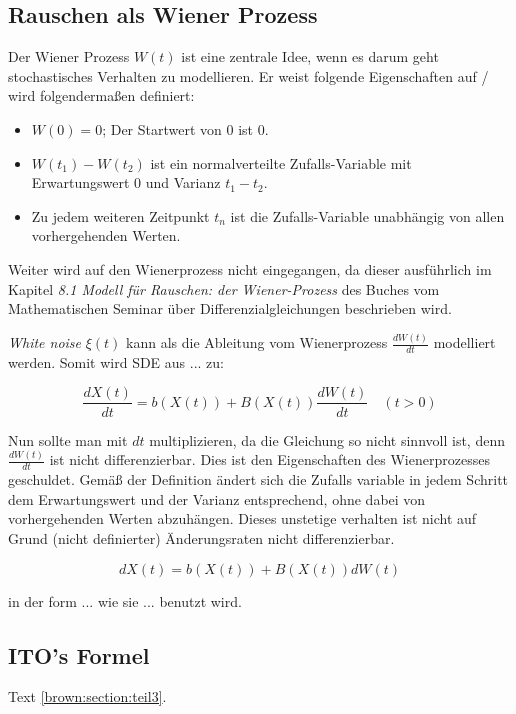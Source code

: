 \subsection{Rauschen als Wiener Prozess
\label{brown:SDGL:Wiener}}

Der Wiener Prozess $ W(t) $ ist eine zentrale Idee, wenn es darum geht stochastisches Verhalten zu modellieren. Er weist folgende Eigenschaften auf / wird folgendermaßen definiert:


\begin{itemize}
	\item $ W(0) = 0 $; Der Startwert von 0 ist 0.
	\item $ W(t_{1}) - W(t_{2}) $ ist ein normalverteilte Zufalls-Variable mit Erwartungswert 0 und Varianz $ t_{1} - t_{2} $.
	\item Zu jedem weiteren Zeitpunkt $ t_{n} $ ist die Zufalls-Variable unabhängig von allen vorhergehenden Werten.
\end{itemize}

Weiter wird auf den Wienerprozess nicht eingegangen, da dieser ausführlich im Kapitel \glqq \textit{8.1 Modell für Rauschen: der Wiener-Prozess}\glqq{} des Buches vom Mathematischen Seminar über Differenzialgleichungen beschrieben wird.

\textit{White noise} $ \xi(t) $ kann als die Ableitung vom Wienerprozess $ \frac{dW(t)}{dt} $ modelliert werden. Somit wird SDE aus ... zu: 

\begin{equation}
	\frac{dX(t)}{dt} = b(X(t)) + B(X(t)) \frac{dW(t)}{dt} \quad (t>0)
\end{equation}

Nun sollte man mit $ dt $  multiplizieren, da die Gleichung so nicht sinnvoll ist, denn $ \frac{dW(t)}{dt} $ ist nicht differenzierbar. Dies ist den Eigenschaften des Wienerprozesses geschuldet. Gemäß der Definition ändert sich die Zufalls variable in jedem Schritt dem Erwartungswert und der Varianz entsprechend, ohne dabei von vorhergehenden Werten abzuhängen. Dieses unstetige verhalten ist nicht auf Grund (nicht definierter) Änderungsraten nicht differenzierbar.

\begin{equation}
	dX(t) = b(X(t)) + B(X(t)) dW(t)
\end{equation}



in der form ... wie sie ... benutzt wird.










\subsection{ITO's Formel
\label{brown:subsection:ito}}






Text
\ref{brown:section:teil3}.



